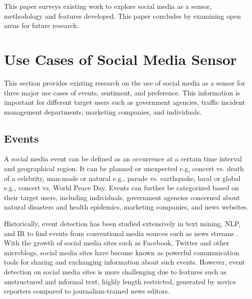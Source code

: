 \documentclass[11pt,a4paper]{article}
\begin{document}
This paper surveys existing work to explore social media as a sensor, methodology and features developed. This paper concludes by examining open areas for future research.

\section{Use Cases of Social Media Sensor}
\label{usecases}

This section provides existing research on the use of social media as a sensor for three major use cases of events, sentiment, and preference. This information is important for different target users such as government agencies, traffic incident management departments, marketing companies, and individuals.

\subsection{Events}

A social media event can be defined as an occurrence at a certain time interval and geographical region. It can be planned or unexpected e.g, concert vs. death of a celebrity, man-made or natural e.g., parade vs. earthquake, local or global e.g., concert vs. World Peace Day. Events can further be categorized based on their target users, including individuals, government agencies concerned about natural disasters and health epidemics, marketing companies, and news websites. 

Historically, event detection has been studied extensively in text mining, NLP, and IR to find events from conventional media sources such as news streams \citet{yang}. With the growth of social media sites such as Facebook, Twitter and other microblogs, social media sites have become known as powerful communication tools for sharing and exchanging information about such events. However, event detection on social media sites is more challenging due to features such as unstructured and informal text, highly length restricted, generated by novice reporters compared to journalism-trained news editors.%
\end{document}
